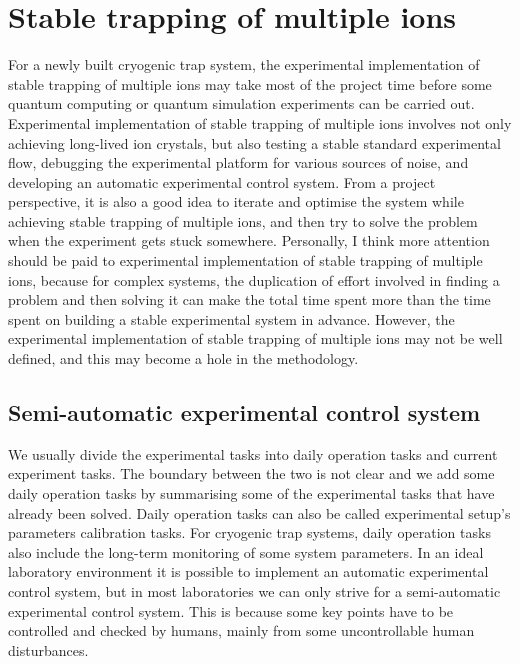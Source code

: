 
\chapter{Stable trapping of multiple ions}
\label{chap:stable_trapping_of_multiple_ions}

For a newly built cryogenic trap system, the experimental implementation of stable trapping of multiple ions may take most of the project time before some quantum computing or quantum simulation experiments can be carried out. Experimental implementation of stable trapping of multiple ions involves not only achieving long-lived ion crystals, but also testing a stable standard experimental flow, debugging the experimental platform for various sources of noise, and developing an automatic experimental control system. From a project perspective, it is also a good idea to iterate and optimise the system while achieving stable trapping of multiple ions, and then try to solve the problem when the experiment gets stuck somewhere. Personally, I think more attention should be paid to experimental implementation of stable trapping of multiple ions, because for complex systems, the duplication of effort involved in finding a problem and then solving it can make the total time spent more than the time spent on building a stable experimental system in advance. However, the experimental implementation of stable trapping of multiple ions may not be well defined, and this may become a hole in the methodology.



\section{Semi-automatic experimental control system}

We usually divide the experimental tasks into daily operation tasks and current experiment tasks. The boundary between the two is not clear and we add some daily operation tasks by summarising some of the experimental tasks that have already been solved. Daily operation tasks can also be called experimental setup's parameters calibration tasks. For cryogenic trap systems, daily operation tasks also include the long-term monitoring of some system parameters. In an ideal laboratory environment it is possible to implement an automatic experimental control system, but in most laboratories we can only strive for a semi-automatic experimental control system. This is because some key points have to be controlled and checked by humans, mainly from some uncontrollable human disturbances.

